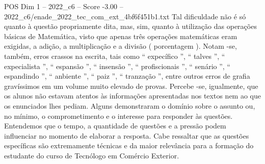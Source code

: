 \begin{textsample}{POS Dim 1 – 2022\_c6 – Score -3.00 – 2022\_c6/enade\_2022\_tec\_com\_ext\_4bf6f451b1.txt}
Tal dificuldade não é só quanto à questão propriamente dita, mas, sim, quanto à utilização das operações básicas de Matemática, visto que apenas três operações matemáticas eram exigidas, a adição, a multiplicação e a divisão ( porcentagem ).
Notam -se, também, erros crassos na escrita, tais como “ expecífico ”, “ talves ”, “ expecialista ”, “ espansão ”, “ insensão ”, “ profiscionais ”, “ senário ”, “ espandindo ”, “ anbiente ”, “ paiz ”, “ tranzação ”, entre outros erros de grafia gravíssimos em um volume muito elevado de provas.
Percebe -se, igualmente, que os alunos não estavam atentos às informações apresentadas nos textos nem ao que os enunciados lhes pediam.
Alguns demonstraram o domínio sobre o assunto ou, no mínimo, o comprometimento e o interesse para responder às questões.
Entendemos que o tempo, a quantidade de questões e a pressão podem influenciar no momento de elaborar a resposta.
Cabe ressaltar que as questões específicas são extremamente técnicas e da maior relevância para a formação do estudante do curso de Tecnólogo em Comércio Exterior.

\end{textsample}
